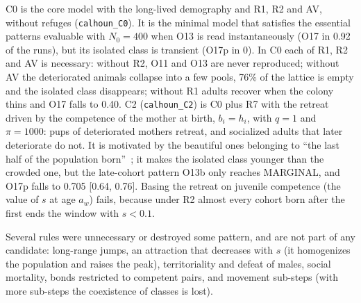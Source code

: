 \textsf{C0} is the core model with the long-lived demography and R1, R2 and AV, without refuges
(\texttt{calhoun\_C0}). It is the minimal model that satisfies the essential patterns evaluable with $N_0=400$ when
O13 is read instantaneously (O17 in 0.92 of the runs), but its isolated class is transient (O17p in 0). In
\textsf{C0} each of R1, R2 and AV is necessary: without R2, O11 and O13 are never reproduced; without AV the
deteriorated animals collapse into a few pools, 76\% of the lattice is empty and the isolated class disappears; without
R1 adults recover when the colony thins and O17 falls to 0.40. \textsf{C2} (\texttt{calhoun\_C2}) is \textsf{C0} plus
R7 with the retreat driven by the competence of the mother at birth, $b_i=h_i$, with $q=1$ and $\pi=1000$: pups of
deteriorated mothers retreat, and socialized adults that later deteriorate do not. It is motivated by the beautiful
ones belonging to ``the last half of the population born''~\cite{Calhoun1973}; it makes the isolated class younger
than the crowded one, but the late-cohort pattern O13b only reaches MARGINAL, and O17p falls to 0.705 [0.64, 0.76].
Basing the retreat on juvenile competence (the value of $s$ at age $a_w$) fails, because under R2 almost every cohort
born after the first ends the window with $s<0.1$.

Several rules were unnecessary or destroyed some pattern, and are not part of any candidate: long-range jumps, an
attraction that decreases with $s$ (it homogenizes the population and raises the peak), territoriality and defeat of
males, social mortality, bonds restricted to competent pairs, and movement sub-steps (with more sub-steps the
coexistence of classes is lost).
